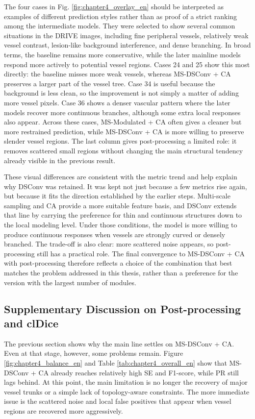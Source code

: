 \documentclass[a4paper,11pt]{article}
\begin{document}
The four cases in Fig. \ref{fig:chapter4_overlay_en} should be interpreted as examples of different prediction styles rather than as proof of a strict ranking among the intermediate models. They were selected to show several common situations in the DRIVE images, including fine peripheral vessels, relatively weak vessel contrast, lesion-like background interference, and dense branching. In broad terms, the baseline remains more conservative, while the later mainline models respond more actively to potential vessel regions. Cases 24 and 25 show this most directly: the baseline misses more weak vessels, whereas MS-DSConv + CA preserves a larger part of the vessel tree. Case 34 is useful because the background is less clean, so the improvement is not simply a matter of adding more vessel pixels. Case 36 shows a denser vascular pattern where the later models recover more continuous branches, although some extra local responses also appear. Across these cases, MS-Modulated + CA often gives a cleaner but more restrained prediction, while MS-DSConv + CA is more willing to preserve slender vessel regions. The last column gives post-processing a limited role: it removes scattered small regions without changing the main structural tendency already visible in the previous result.

These visual differences are consistent with the metric trend and help explain why DSConv was retained. It was kept not just because a few metrics rise again, but because it fits the direction established by the earlier steps. Multi-scale sampling and CA provide a more suitable feature basis, and DSConv extends that line by carrying the preference for thin and continuous structures down to the local modeling level. Under those conditions, the model is more willing to produce continuous responses when vessels are strongly curved or densely branched. The trade-off is also clear: more scattered noise appears, so post-processing still has a practical role. The final convergence to MS-DSConv + CA with post-processing therefore reflects a choice of the combination that best matches the problem addressed in this thesis, rather than a preference for the version with the largest number of modules.

\subsection{Supplementary Discussion on Post-processing and clDice}

The previous section shows why the main line settles on MS-DSConv + CA. Even at that stage, however, some problems remain. Figure \ref{fig:chapter4_balance_en} and Table \ref{tab:chapter4_overall_en} show that MS-DSConv + CA already reaches relatively high SE and F1-score, while PR still lags behind. At this point, the main limitation is no longer the recovery of major vessel trunks or a simple lack of topology-aware constraints. The more immediate issue is the scattered noise and local false positives that appear when vessel regions are recovered more aggressively.
\end{document}
